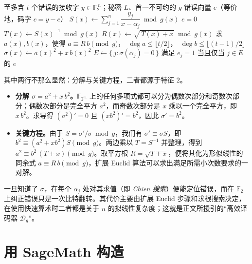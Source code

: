 \begin{algorithm}[H]
\caption{对二元 Goppa 码 $\Gamma(L,g)$ 的 Patterson 译码，其中 $g$ 首一不可约，$\deg g=t$}
\label{alg:patterson}
\begin{algorithmic}[1]
\Require 至多含 $t$ 个错误的接收字 $y\in\mathbb{F}_2^{\,n}$；秘密 $L$、首一不可约的 $g$
\Ensure 错误向量 $e$（等价地，码字 $c=y-e$）
\State $S(x) \gets \sum_{j=1}^{n} \dfrac{y_j}{x-\alpha_j} \bmod g(x)$ 
 \State \Return $e=0$  \EndIf
\State $T(x) \gets S(x)^{-1} \bmod g(x)$
\State $R(x) \gets \sqrt{\,T(x)+x\,} \bmod g(x)$ 
\State 求 $a(x),b(x)$，使得 $a \equiv R\,b \pmod{g}$，\ $\deg a\le\lfloor t/2\rfloor$，\ $\deg b\le\lfloor (t-1)/2\rfloor$
\Statex \hfill{}
\State $\sigma(x) \gets a(x)^2 + x\,b(x)^2$ 
\State $E \gets \{\, j : \sigma(\alpha_j)=0 \,\}$ 
\State \Return 满足 $e_j=1$ 当且仅当 $j\in E$ 的 $e$
\end{algorithmic}
\end{algorithm}

其中两行不那么显然：分解与关键方程，二者都源于特征 $2$。

\begin{itemize}
  \item \textbf{分解 $\sigma=a^2+x\,b^2$。}$\mathbb{F}_{2^m}$ 上的任何多项式都可以分为偶数次部分和奇数次部分；偶数次部分是完全平方 $a^2$，而奇数次部分是 $x$ 乘以一个完全平方，即 $x\,b^2$。求导得 $(a^2)'=0$ 且 $(x b^2)'=b^2$，因此 $\sigma'=b^2$。
  \item \textbf{关键方程。}由于 $S=\sigma'/\sigma \bmod g$，我们有 $\sigma'\equiv \sigma S$，即 $b^2\equiv(a^2+xb^2)S \pmod g$。两边乘以 $T=S^{-1}$ 并整理，得到 $a^2\equiv b^2\,(T+x)\pmod g$。取平方根 $R=\sqrt{T+x}$，便将其化为形似线性的同余式 $a\equiv R\,b\pmod g$，扩展 Euclid 算法可以求出满足所需小次数要求的一对解。
\end{itemize}

一旦知道了 $\sigma$，在每个 $\alpha_j$ 处对其求值（即 \emph{Chien 搜索}）便能定位错误，而在 $\mathbb{F}_2$ 上纠正错误只是一次比特翻转。其代价主要由扩展 Euclid 步骤和求根搜索决定，在使用快速算术时二者都是关于 $n$ 的拟线性复杂度；这就是正文所援引的“高效译码器 $\mathcal{D}_g$”。

\section{用 SageMath 构造}

